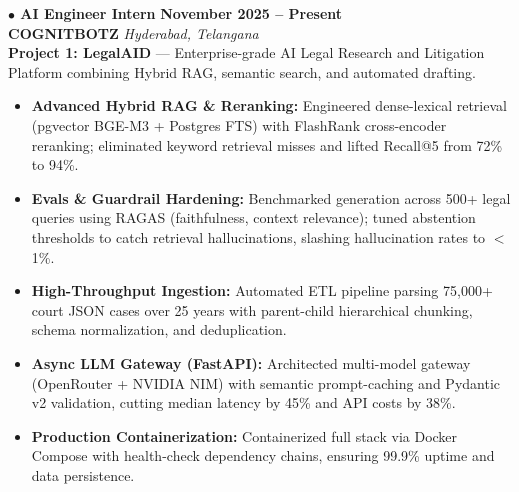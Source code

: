 \documentclass[a4paper,10pt]{article}
\begin{document}
\noindent
\textbf{\normalsize $\bullet$ AI Engineer Intern} \hfill \textbf{November 2025 -- Present} \\
\textbf{COGNITBOTZ} \hfill \textit{Hyderabad, Telangana} \\[2pt]

\noindent
\textbf{\color{projecttitle}Project 1: LegalAID} --- Enterprise-grade AI Legal Research and Litigation Platform combining Hybrid RAG, semantic search, and automated drafting.
\begin{itemize}
    \item \textbf{Advanced Hybrid RAG \& Reranking:} Engineered dense-lexical retrieval (pgvector BGE-M3 + Postgres FTS) with FlashRank cross-encoder reranking; eliminated keyword retrieval misses and lifted Recall@5 from 72\% to 94\%.
    \item \textbf{Evals \& Guardrail Hardening:} Benchmarked generation across 500+ legal queries using RAGAS (faithfulness, context relevance); tuned abstention thresholds to catch retrieval hallucinations, slashing hallucination rates to $<$1\%.
    \item \textbf{High-Throughput Ingestion:} Automated ETL pipeline parsing 75,000+ court JSON cases over 25 years with parent-child hierarchical chunking, schema normalization, and deduplication.
    \item \textbf{Async LLM Gateway (FastAPI):} Architected multi-model gateway (OpenRouter + NVIDIA NIM) with semantic prompt-caching and Pydantic v2 validation, cutting median latency by 45\% and API costs by 38\%.
    \item \textbf{Production Containerization:} Containerized full stack via Docker Compose with health-check dependency chains, ensuring 99.9\% uptime and data persistence.
\end{itemize}

\vspace{5pt}
\end{document}
